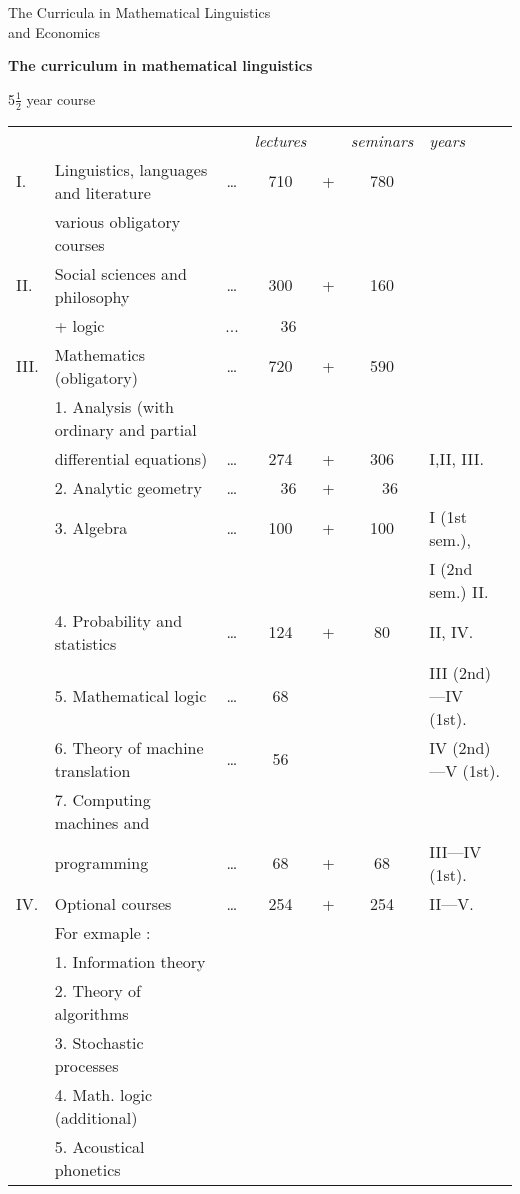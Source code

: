 \begin{center}
The Curricula in Mathematical Linguistics\\
and Economics

\textbf{The curriculum in mathematical linguistics}

5$\frac{1}{2}$ year course
\end{center}
\begin{center}
{\fontsize{9pt}{11pt}\selectfont
  \tabcolsep=1.5pt
\begin{tabular}{llccccl}
&& &\textit{lectures} & & \textit{seminars} & \textit{years} \\
I. &Linguistics, languages and literature & \ldots & 710 &+& 780 & \\
&various obligatory courses\\
II. & Social sciences and philosophy & \ldots & 300 & + & 160 &\\
& \quad + logic &... & ~~36 & && \\
III. & Mathematics (obligatory) & \ldots & 720 & +& 590 & \\
& 1. Analysis (with ordinary and partial \\
& \quad differential equations) & \ldots & 274 & + & 306 & I,II, III.\\
& 2. Analytic geometry & \ldots & ~~36 & + & ~~36 & \\
& 3. Algebra & \ldots & 100 & +& 100 & I (1st sem.), \\
& & & & & & I (2nd sem.) II.\\
& 4. Probability and statistics  & \ldots & 124 & +& 80 & II, IV.\\
& 5. Mathematical logic & \ldots & 68 &&& III (2nd)---IV (1st).\\
& 6. Theory of machine translation & \ldots & 56 & & & IV (2nd)---V
(1st).\\
& 7. Computing machines and\\ 
& \quad  programming & \ldots & 68 & + & 68 & III---IV (1st). \\
IV. & Optional courses & \ldots & 254 & + & 254 & II---V.\\
& For exmaple : \\
& 1. Information theory\\
&2. Theory of algorithms \\
&3. Stochastic processes \\
&4. Math. logic (additional) \\
&5. Acoustical phonetics
\end{tabular}}\relax
\end{center}\pageoriginale

